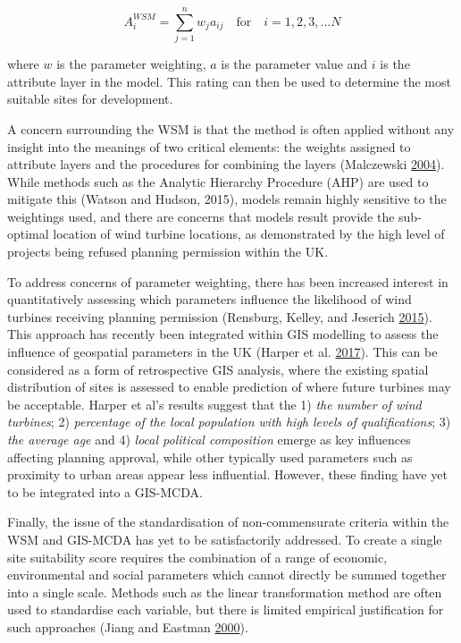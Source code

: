 \documentclass[a4paper,]{article}
\theoremstyle{definition}
\theoremstyle{definition}
\theoremstyle{remark}
\begin{document}
{\begin{equation}
 A_{i}^{WSM} = \sum_{j=1}^{n} w_{j} a_{ij} \quad \text{for} \quad i = 1,2,3,...N
  \label{eq:WSM}
\end{equation}

where \(w\) is the parameter weighting, \(a\) is the parameter value and
\(i\) is the attribute layer in the model. This rating can then be used
to determine the most suitable sites for development.

A concern surrounding the WSM is that the method is often applied
without any insight into the meanings of two critical elements: the
weights assigned to attribute layers and the procedures for combining
the layers (Malczewski \protect\hyperlink{ref-Malczewski2004}{2004}).
While methods such as the Analytic Hierarchy Procedure (AHP) are used to
mitigate this (Watson and Hudson, 2015), models remain highly sensitive
to the weightings used, and there are concerns that models result
provide the sub-optimal location of wind turbine locations, as
demonstrated by the high level of projects being refused planning
permission within the UK.

To address concerns of parameter weighting, there has been increased
interest in quantitatively assessing which parameters influence the
likelihood of wind turbines receiving planning permission (Rensburg,
Kelley, and Jeserich \protect\hyperlink{ref-VanRensburg20}{2015}). This
approach has recently been integrated within GIS modelling to assess the
influence of geospatial parameters in the UK (Harper et al.
\protect\hyperlink{ref-Harper2017}{2017}). This can be considered as a
form of retrospective GIS analysis, where the existing spatial
distribution of sites is assessed to enable prediction of where future
turbines may be acceptable. Harper et al's results suggest that the 1)
\emph{the number of wind turbines}; 2) \emph{percentage of the local
population with high levels of qualifications}; 3) \emph{the average
age} and 4) \emph{local political composition} emerge as key influences
affecting planning approval, while other typically used parameters such
as proximity to urban areas appear less influential. However, these
finding have yet to be integrated into a GIS-MCDA.

Finally, the issue of the standardisation of non-commensurate criteria
within the WSM and GIS-MCDA has yet to be satisfactorily addressed. To
create a single site suitability score requires the combination of a
range of economic, environmental and social parameters which cannot
directly be summed together into a single scale. Methods such as the
linear transformation method are often used to standardise each
variable, but there is limited empirical justification for such
approaches (Jiang and Eastman \protect\hyperlink{ref-Jiang2000}{2000}).

}
\end{document}
